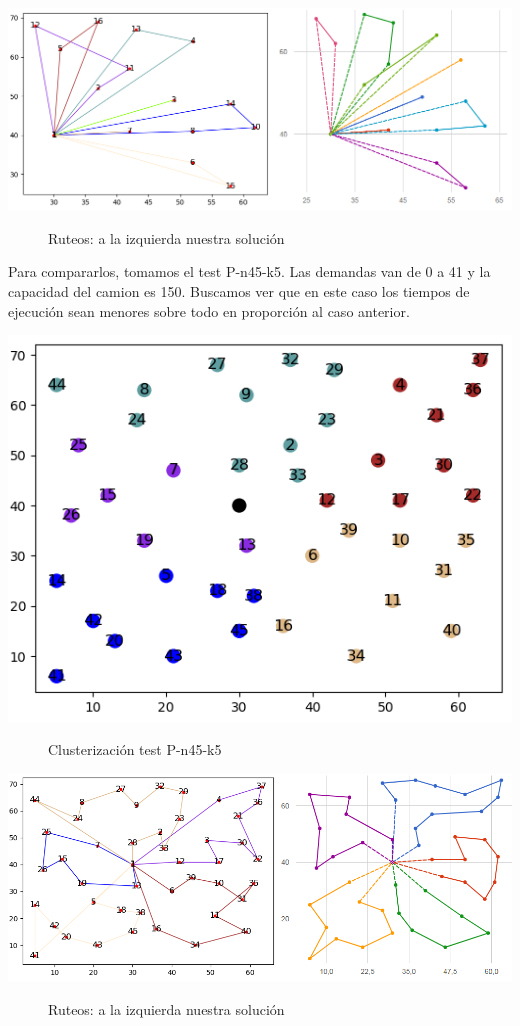 \documentclass[11pt,a4paper]{article}
\begin{document}
\includegraphics[scale=.6]{graficos/P-n16-k8/caminos.png}
\begin{figure}[!h]
\caption{Ruteos: a la izquierda nuestra solución}
\end{figure}

Para compararlos, tomamos el test P-n45-k5. Las demandas van de 0 a 41 y la capacidad del camion es 150. Buscamos ver que en este caso los tiempos de ejecución sean menores sobre todo en proporción al caso anterior.

\includegraphics[scale=.5]{graficos/P-n45-k5/cluster.png}
\begin{figure}[!h]
\caption{Clusterización test P-n45-k5}
\end{figure}

\includegraphics[scale=.5]{graficos/P-n45-k5/caminos.png}
\begin{figure}[!h]
\caption{Ruteos: a la izquierda nuestra solución}
\end{figure}
\end{document}
